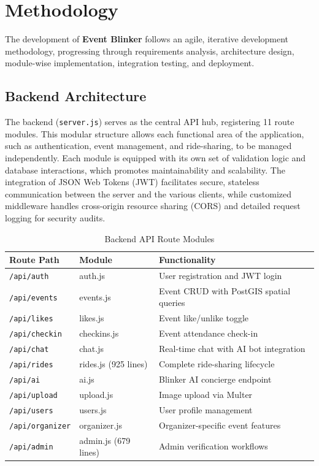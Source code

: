 \chapter{Methodology}

The development of \textbf{Event Blinker} follows an agile, iterative development methodology, progressing through requirements analysis, architecture design, module-wise implementation, integration testing, and deployment.

\section{Backend Architecture}
The backend (\texttt{server.js}) serves as the central API hub, registering 11 route modules. This modular structure allows each functional area of the application, such as authentication, event management, and ride-sharing, to be managed independently. Each module is equipped with its own set of validation logic and database interactions, which promotes maintainability and scalability. The integration of JSON Web Tokens (JWT) facilitates secure, stateless communication between the server and the various clients, while customized middleware handles cross-origin resource sharing (CORS) and detailed request logging for security audits.

\begin{table}[H]
\centering
\caption{Backend API Route Modules}
\label{tab:api_routes}
\begin{tabular}{@{}llp{7cm}@{}}
\toprule
\textbf{Route Path} & \textbf{Module} & \textbf{Functionality} \\
\midrule
\texttt{/api/auth} & auth.js & User registration and JWT login \\
\texttt{/api/events} & events.js & Event CRUD with PostGIS spatial queries \\
\texttt{/api/likes} & likes.js & Event like/unlike toggle \\
\texttt{/api/checkin} & checkins.js & Event attendance check-in \\
\texttt{/api/chat} & chat.js & Real-time chat with AI bot integration \\
\texttt{/api/rides} & rides.js (925 lines) & Complete ride-sharing lifecycle \\
\texttt{/api/ai} & ai.js & Blinker AI concierge endpoint \\
\texttt{/api/upload} & upload.js & Image upload via Multer \\
\texttt{/api/users} & users.js & User profile management \\
\texttt{/api/organizer} & organizer.js & Organizer-specific event features \\
\texttt{/api/admin} & admin.js (679 lines) & Admin verification workflows \\
\bottomrule
\end{tabular}
\end{table}

